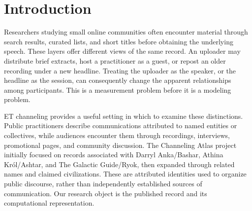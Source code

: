\begin{abstract}
Public videos described as extraterrestrial (ET) channeling circulate through practitioners' accounts, interview programs, and repost channels. Comparing these records requires distinguishing a human speaker from an uploader and a title from spoken content. We present an exploratory, source-linked study of a bounded YouTube index assembled from an existing research atlas and a supplied research archive. The merged sample contains 925 unique upload identifiers; a metadata refresh yields 881 usable durations and 880 exact publication dates after explicitly labeled inheritance. We compare sampled upload lengths, transparent keyword indicators, sparse lexical representations, and learned sentence embeddings. A purposive caption pilot retrieves 34 tracks from 36 attempts and retains 30 English documents. In the matched text-layer comparison, 22 videos from 11 publishing accounts contribute to 55 account pairs; title-based and caption-based similarity rankings correlate at only $\rho=0.206$. Identity masking changes title rankings ($\rho=0.626$), whereas excluding repeated title strings changes them little ($\rho=0.992$). Removing caption openings and endings preserves broad pair rankings ($\rho=0.969$) but changes four of 13 accounts' nearest neighbors. These descriptive results show that account identity, text layer, and sampling decisions materially affect comparisons in this corpus. They do not assess the origin or truth of channeling claims. We release provenance-preserving metadata, derived features, executable analysis, and an updateable dashboard, while marking human validation and further analyses as TBD.
\end{abstract}

\section{Introduction}
Researchers studying small online communities often encounter material through search results, curated lists, and short titles before obtaining the underlying speech. These layers offer different views of the same record. An uploader may distribute brief extracts, host a practitioner as a guest, or repost an older recording under a new headline. Treating the uploader as the speaker, or the headline as the session, can consequently change the apparent relationships among participants. This is a measurement problem before it is a modeling problem.

ET channeling provides a useful setting in which to examine these distinctions. Public practitioners describe communications attributed to named entities or collectives, while audiences encounter them through recordings, interviews, promotional pages, and community discussion. The Channeling Atlas project initially focused on records associated with Darryl Anka/Bashar, Athina Kr\'ol/Ashtar, and The Galactic Guide/Ryok, then expanded through related names and claimed civilizations. These are attributed identities used to organize public discourse, rather than independently established sources of communication. Our research object is the published record and its computational representation.


